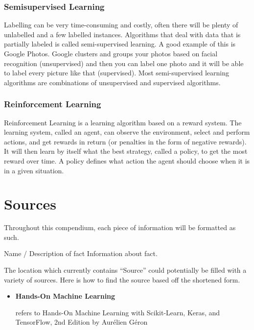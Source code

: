\documentclass[12pt]{article}
\newenvironment{fact*}[2][]
    {
    \begin{adjustwidth}{1em}{0em}
    \noindent
    \textbf{#2} \hfill #1
    
    \vspace{0.1in}
    \noindent
    \ignorespaces
    }
    {
    \end{adjustwidth}
    }
\begin{document}
    \subsubsection{Semisupervised Learning}
        Labelling can be very time-consuming and costly, often there will be plenty of unlabelled and a few labelled instances.
        Algorithms that deal with data that is partially labeled is called semi-supervised learning. A good example of this is
        Google Photos. Google clusters and groups your photos based on facial recognition (unsupervised) and then you can label one photo and it
        will be able to label every picture like that (supervised). Most semi-supervised learning algorithms are combinations of unsupervised and 
        supervised algorithms.  
    
    \subsubsection{Reinforcement Learning}
        Reinforcement Learning is a learning algorithm based on a reward system. The learning system, called an agent, can observe the environment,
        select and perform actions, and get rewards in return (or penalties in the form of negative rewards). It will then learn by itself what the 
        best strategy, called a policy, to get the most reward over time. A policy defines what action the agent should choose when it is in a given
        situation.

\newpage

\section*{Sources}
    Throughout this compendium, each piece of information will be formatted as such.
    
    \vspace{0.1in}
    \begin{fact*}[Source]{Name / Description of fact}
        Information about fact.
    \end{fact*}
    \vspace{0.3in}
    
    \noindent The location which currently contains ``Source'' could potentially be filled with a variety of sources. Here is how to find the source based off the shortened form.
    
    \begin{itemize}
        \item \hypertarget{homl}{\textbf{Hands-On Machine Learning}} refers to Hands-On Machine Learning with Scikit-Learn, Keras, and TensorFlow, 2nd Edition by Aurélien Géron
    \end{itemize}
\end{document}
